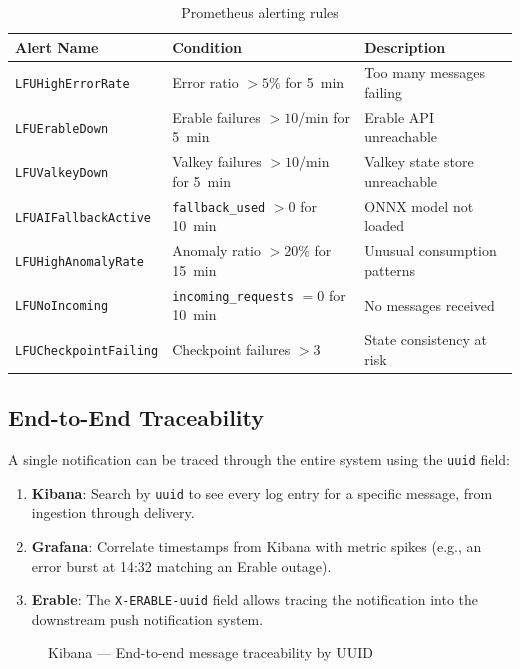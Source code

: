 \begin{table}[H]
    \centering
    \caption{Prometheus alerting rules}
    \label{tab:alerts}
    \begin{tabularx}{\textwidth}{l l X}
\toprule
\textbf{Alert Name} & \textbf{Condition} & \textbf{Description} \\
\midrule
\texttt{LFUHighErrorRate} & Error ratio $> 5\%$ for 5~min & Too many messages failing \\
\texttt{LFUErableDown} & Erable failures $> 10$/min for 5~min & Erable API unreachable \\
\texttt{LFUValkeyDown} & Valkey failures $> 10$/min for 5~min & Valkey state store unreachable \\
\texttt{LFUAIFallbackActive} & \texttt{fallback\_used} $> 0$ for 10~min & ONNX model not loaded \\
\texttt{LFUHighAnomalyRate} & Anomaly ratio $> 20\%$ for 15~min & Unusual consumption patterns \\
\texttt{LFUNoIncoming} & \texttt{incoming\_requests} $= 0$ for 10~min & No messages received \\
\texttt{LFUCheckpointFailing} & Checkpoint failures $> 3$ & State consistency at risk \\
\bottomrule
    \end{tabularx}
\end{table}

\subsection{End-to-End Traceability}

A single notification can be traced through the entire system using the \texttt{uuid} field:

\begin{enumerate}
    \item \textbf{Kibana}: Search by \texttt{uuid} to see every log entry for a specific message, from ingestion through delivery.
    \item \textbf{Grafana}: Correlate timestamps from Kibana with metric spikes (e.g., an error burst at 14:32 matching an Erable outage).
    \item \textbf{Erable}: The \texttt{X-ERABLE-uuid} field allows tracing the notification into the downstream push notification system.
\end{enumerate}

\begin{figure}[H]
    \centering
    \caption{Kibana --- End-to-end message traceability by UUID}
    \label{fig:kibana-trace}
\end{figure}

